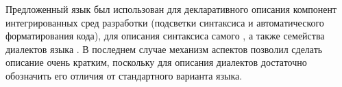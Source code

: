 Предложенный язык был использован для декларативного описания компонент интегрированных сред разработки (подсветки синтаксиса и автоматического форматирования кода), для описания синтаксиса самого \GRM{}, а также семейства диалектов языка . В последнем случае механизм аспектов позволил сделать описание очень кратким, поскольку для описания диалектов достаточно обозначить его отличия от стандартного варианта языка.